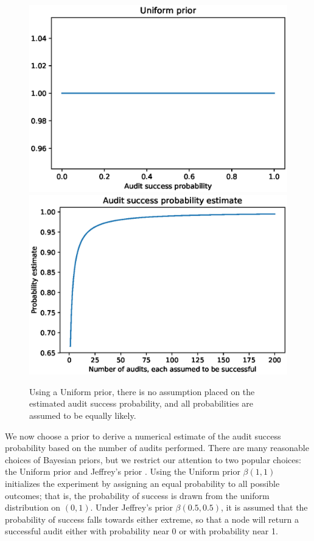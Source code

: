 \begin{figure}[!htbp]
    \centering
    \includegraphics[height=.22\textheight]{audit-success/uniform_prior.eps}
    \includegraphics[height=.22\textheight]{audit-success/uniform_estimate.eps}
\caption{Using a Uniform prior, there is no assumption placed on the estimated
audit success probability, and all probabilities are assumed to be equally likely.}
\label{fig:unif_prior}
\end{figure}

We now choose a prior to derive a numerical estimate of the audit success probability
based on the number of audits performed.
There are many reasonable choices of Bayesian priors, but we restrict our attention to
two popular choices: the Uniform prior and Jeffrey's prior \cite{jeffrey}.
Using the Uniform prior $\beta(1,1)$ initializes the experiment
by assigning an equal probability to
all possible outcomes;
that is, the probability of success is drawn from the uniform
distribution on $(0,1)$.
Under Jeffrey's prior $\beta(0.5,0.5)$,
it is assumed that the probability of
success falls towards either extreme, so that a node will return a successful audit
either with probability near 0 or with probability near 1.

